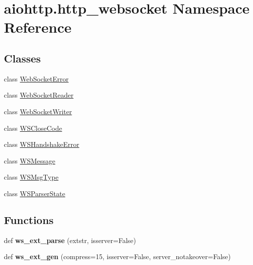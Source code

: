 \hypertarget{namespaceaiohttp_1_1http__websocket}{}\section{aiohttp.\+http\+\_\+websocket Namespace Reference}
\label{namespaceaiohttp_1_1http__websocket}
\subsection*{Classes}
\begin{DoxyCompactItemize}
\item 
class \hyperlink{classaiohttp_1_1http__websocket_1_1_web_socket_error}{Web\+Socket\+Error}
\item 
class \hyperlink{classaiohttp_1_1http__websocket_1_1_web_socket_reader}{Web\+Socket\+Reader}
\item 
class \hyperlink{classaiohttp_1_1http__websocket_1_1_web_socket_writer}{Web\+Socket\+Writer}
\item 
class \hyperlink{classaiohttp_1_1http__websocket_1_1_w_s_close_code}{W\+S\+Close\+Code}
\item 
class \hyperlink{classaiohttp_1_1http__websocket_1_1_w_s_handshake_error}{W\+S\+Handshake\+Error}
\item 
class \hyperlink{classaiohttp_1_1http__websocket_1_1_w_s_message}{W\+S\+Message}
\item 
class \hyperlink{classaiohttp_1_1http__websocket_1_1_w_s_msg_type}{W\+S\+Msg\+Type}
\item 
class \hyperlink{classaiohttp_1_1http__websocket_1_1_w_s_parser_state}{W\+S\+Parser\+State}
\end{DoxyCompactItemize}
\subsection*{Functions}
\begin{DoxyCompactItemize}
\item 
\mbox{\label{namespaceaiohttp_1_1http__websocket_a62028adfbdc841f05e53610f89b6df92}} 
def {\bfseries ws\+\_\+ext\+\_\+parse} (extstr, isserver=False)
\item 
\mbox{\label{namespaceaiohttp_1_1http__websocket_ad3abbe32655ba260830dc4f90db389a2}} 
def {\bfseries ws\+\_\+ext\+\_\+gen} (compress=15, isserver=False, server\+\_\+notakeover=False)
\end{DoxyCompactItemize}
